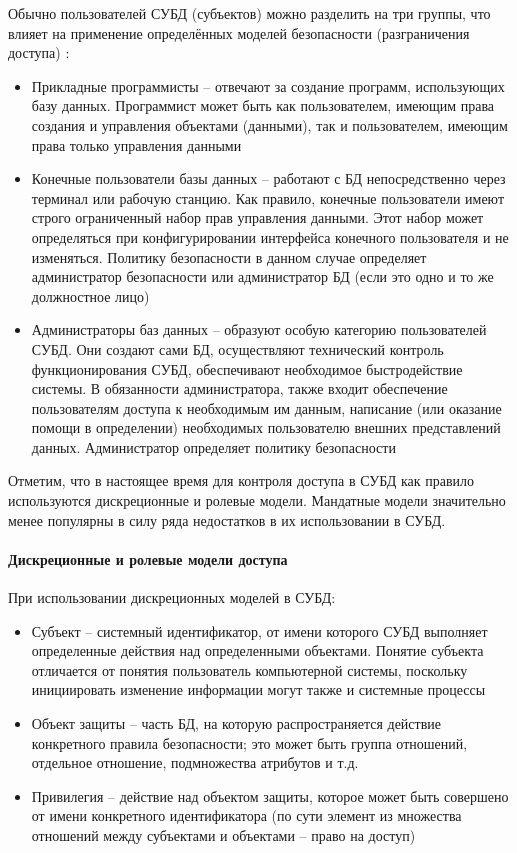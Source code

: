 Обычно пользователей СУБД (субъектов) можно разделить на три группы, что влияет на применение определённых 
моделей безопасности (разграничения доступа) \autocite{CitForumSafeDB}:
\begin{itemize}
    \item Прикладные программисты -- отвечают за создание программ, использующих базу данных. Программист 
    может быть как пользователем, имеющим права создания и управления объектами (данными), так и пользователем, 
    имеющим права только управления данными

    \item Конечные пользователи базы данных -- работают с БД непосредственно через терминал или рабочую станцию. 
    Как правило, конечные пользователи имеют строго ограниченный набор прав управления данными. Этот набор 
    может определяться при конфигурировании интерфейса конечного пользователя и не изменяться. Политику 
    безопасности в данном случае определяет администратор безопасности или администратор БД (если это одно и 
    то же должностное лицо)

    \item Администраторы баз данных -- образуют особую категорию пользователей СУБД. Они создают сами БД, 
    осуществляют технический контроль функционирования СУБД, обеспечивают необходимое быстродействие системы. 
    В обязанности администратора, также входит обеспечение пользователям доступа к необходимым им данным, 
    написание (или оказание помощи в определении) необходимых пользователю внешних представлений данных. 
    Администратор определяет политику безопасности
\end{itemize}

Отметим, что в настоящее время для контроля доступа в СУБД как правило используются дискреционные и ролевые 
модели. Мандатные модели значительно менее популярны в силу ряда недостатков в их использовании в СУБД.

\paragraph{Дискреционные и ролевые модели доступа}

При использовании дискреционных моделей в СУБД:
\begin{itemize}
    \item Субъект -- системный идентификатор, от имени которого СУБД выполняет определенные действия над 
    определенными объектами. Понятие субъекта отличается от понятия пользователь компьютерной системы, 
    поскольку инициировать изменение информации могут также и системные процессы
    \item Объект защиты -- часть БД, на которую распространяется действие конкретного правила безопасности; 
    это может быть группа отношений, отдельное отношение, подмножества атрибутов и т.д.
    \item Привилегия -- действие над объектом защиты, которое может быть совершено от имени конкретного 
    идентификатора (по сути элемент из множества отношений между субъектами и объектами -- право на доступ)
\end{itemize}

